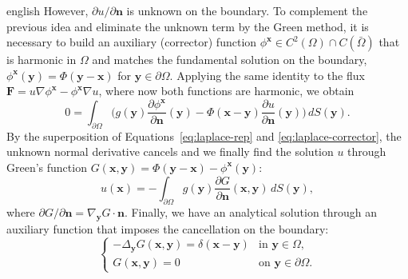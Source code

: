\documentclass[../0000.tex]{subfiles}
\begin{document}
\begin{hyphenrules}{english}
However, $\partial u/\partial\mathbf{n}$ is unknown on the boundary. To complement the previous idea and
eliminate the unknown term by the Green method, it is necessary to build an auxiliary (corrector)
function $\phi^{\mathbf{x}}\in C^2(\Omega)\cap C(\bar\Omega)$ that is harmonic in $\Omega$ and matches the
fundamental solution on the boundary, $\phi^{\mathbf{x}}(\mathbf{y})=\Phi(\mathbf{y}-\mathbf{x})$ for $\mathbf{y}\in\partial\Omega$. Applying
the same identity to the flux $\mathbf{F}=u\nabla\phi^{\mathbf{x}}-\phi^{\mathbf{x}}\nabla u$, where now both functions are
harmonic, we obtain
\begin{equation}
  0=\int_{\partial\Omega}\Big(g(\mathbf{y})\frac{\partial\phi^{\mathbf{x}}}{\partial\mathbf{n}}(\mathbf{y})
    -\Phi(\mathbf{x}-\mathbf{y})\frac{\partial u}{\partial\mathbf{n}}(\mathbf{y})\Big)\,d S(\mathbf{y}).
  \label{eq:laplace-corrector}
\end{equation}
By the superposition of Equations~\eqref{eq:laplace-rep} and \eqref{eq:laplace-corrector}, the unknown normal derivative
cancels and we finally find the solution $u$ through Green's function
$G(\mathbf{x},\mathbf{y})=\Phi(\mathbf{y}-\mathbf{x})-\phi^{\mathbf{x}}(\mathbf{y})$:
\begin{equation}
  u(\mathbf{x})=-\int_{\partial\Omega}g(\mathbf{y})\frac{\partial G}{\partial\mathbf{n}}(\mathbf{x},\mathbf{y})\,d S(\mathbf{y}),
  \label{eq:app-laplace-green}
\end{equation}
where $\partial G/\partial\mathbf{n}=\nabla_{\mathbf{y}}G\cdot\mathbf{n}$. Finally, we have an analytical solution through an
auxiliary function that imposes the cancellation on the boundary:
\begin{equation}
  \begin{cases}
    -\Delta_{\mathbf{y}}G(\mathbf{x},\mathbf{y})=\delta(\mathbf{x}-\mathbf{y}) & \text{in } \mathbf{y}\in\Omega,\\
    G(\mathbf{x},\mathbf{y})=0 & \text{on } \mathbf{y}\in\partial\Omega.
  \end{cases}
  \label{eq:app-green-function}
\end{equation}


\end{hyphenrules}
\end{document}
